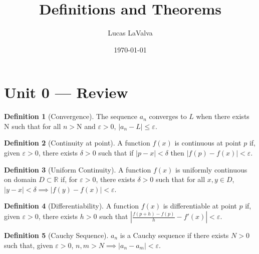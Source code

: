 \documentclass{article}
\title{Definitions and Theorems}
\author{Lucas LaValva}
\date{\today}
\theoremstyle{definition}
\newtheorem{definition}{Definition}[section]
\begin{document}
\maketitle

\section{Unit 0 --- Review}
\begin{definition}[Convergence]
    The sequence $a_n$ converges to $L$ when there exists
    N such that for all $n>\mathrm{N}$ and $\varepsilon>0$,
    $\left\lvert a_n-L\right\rvert\leq \varepsilon$.
\end{definition}
\begin{definition}[Continuity at point]
    A function $f(x)$ is continuous at point $p$ if, given
    $\varepsilon>0$, there exists $\delta>0$ such that if
    $\left\lvert p-x \right\rvert<\delta$ then
    $\left\lvert f(p)-f(x)\right\rvert<\varepsilon$.
\end{definition}
\begin{definition}[Uniform Continuity]
    A function $f(x)$ is uniformly continuous on domain
    $D\subset \mathbb{R}$ if, for $\varepsilon>0$, there
    exists $\delta>0$ such that for all $x,y\in  D$,
    $\left\lvert y-x\right\rvert<\delta \implies
        \left\lvert f(y)-f(x)\right\rvert <\varepsilon$.
\end{definition}
\begin{definition}[Differentiability]
    A function $f(x)$ is differentiable at point $p$ if,
    given $\varepsilon>0$, there exists $h>0$ such
    that $\left\lvert
        \frac{f(p+h)-f(p)}{h} - f'(x)
        \right\rvert<\varepsilon$.
\end{definition}
\begin{definition}[Cauchy Sequence]
    ${a_n}$ is a Cauchy sequence if there exists
    $N>0$ such that, given $\varepsilon>0$,
    $n, m > N \implies
        \left\lvert a_n-a_m\right\rvert <\varepsilon$.
\end{definition}

\end{document}
